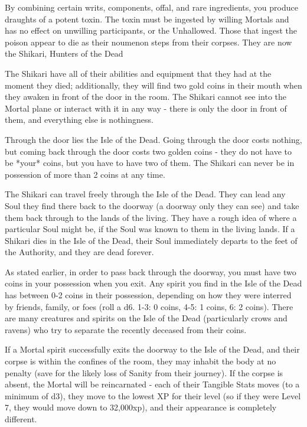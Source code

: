 {By combining certain writs, components, offal, and rare ingredients, you produce \LVL draughts of a potent toxin. The toxin must be ingested by willing Mortals and has no effect on unwilling participants, or the Unhallowed.  Those that ingest the poison appear to die as their noumenon steps from their corpses.  They are now the Shikari, Hunters of the Dead

The Shikari have all of their abilities and equipment that they had at the moment they died; additionally, they will find two gold coins in their mouth when they awaken in front of the door in the room. The Shikari cannot see into the Mortal plane or interact with it in any way - there is only the door in front of them, and everything else is nothingness.

Through the door lies the Isle of the Dead.  Going through the door costs nothing, but coming back through the door costs two golden coins - they do not have to be *your* coins, but you have to have two of them.  The Shikari can never be in possession of more than 2 coins at any time.

The Shikari can travel freely through the Isle of the Dead.  They can lead any Soul they find there back to the doorway (a doorway only they can see) and take them back through to the lands of the living.  They have a rough idea of where a particular Soul might be, if the Soul was known to them in the living lands. If a Shikari dies in the Isle of the Dead, their Soul immediately departs to the feet of the Authority, and they are dead forever.  

As stated earlier, in order to pass back through the doorway, you must have two coins in your possession when you exit.  Any spirit you find in the Isle of the Dead has between 0-2 coins in their possession, depending on how they were interred by friends, family, or foes (roll a d6.  1-3: 0 coins, 4-5: 1 coins, 6: 2 coins).  There are many creatures and spirits on the Isle of the Dead (particularly crows and ravens) who try to separate the recently deceased from their coins.

If a Mortal spirit successfully exits the doorway to the Isle of the Dead, and their corpse is within the confines of the room, they may inhabit the body at no penalty (save for the likely loss of Sanity from their journey).  If the corpse is absent, the Mortal will be reincarnated - each of their Tangible Stats moves \DCDOWN (to a minimum of d3), they move to the lowest XP for their level (so if they were Level 7, they would move down to 32,000xp), and their appearance is completely different. 

}
